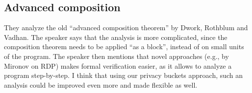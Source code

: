 \documentclass{article}
\begin{document}
\subsection{Advanced composition}
They analyze the old ``advanced composition theorem'' by Dwork, Rothblum and Vadhan. The speaker says that the analysis is more complicated, since the composition theorem needs to be applied ``as a block'', instead of on small units of the program. The speaker then mentions that novel approaches (e.g., by Mironov on RDP) makes formal verification easier, as it allows to analyze a program step-by-step.
I think that using our privacy buckets approach, such an analysis could be improved even more and made flexible as well.




\end{document}
